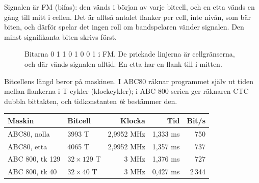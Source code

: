 \documentclass[10pt]{article}
\begin{document}
Signalen är FM (bifas): den vänds i början av varje bitcell, och en etta
vänds en gång till mitt i cellen. Det är alltså antalet flanker per cell,
inte nivån, som bär biten, och därför spelar det ingen roll om
bandspelaren vänder signalen. Den minst signifikanta biten skrivs först.

\begin{figure}[H]
\centering
{}
\caption{Bitarna 0 1 1 0 1 0 0 1 i FM. De prickade linjerna är cellgränserna,
och där vänds signalen alltid. En etta har en flank till i mitten.}
\end{figure}

Bitcellens längd beror på maskinen. I ABC80 räknar programmet själv ut
tiden mellan flankerna i T-cykler (klockcykler); i ABC 800-serien ger
räknaren CTC dubbla bittakten, och tidkonstanten \emph{tk} bestämmer den.

\begin{center}
\small
\begin{tabular}{@{}llrrr@{}}
\toprule
Maskin & Bitcell & Klocka & Tid & Bit/s \\
\midrule
ABC80, nolla & 3993 T & 2,9952 MHz & 1,333 ms & 750 \\
ABC80, etta & 4065 T & 2,9952 MHz & 1,357 ms & 737 \\
ABC 800, tk 129 & $32 \times 129$ T & 3 MHz & 1,376 ms & 727 \\
ABC 800, tk 40 & $32 \times 40$ T & 3 MHz & 0,427 ms & 2\,344 \\
\bottomrule
\end{tabular}
\end{center}
\end{document}
